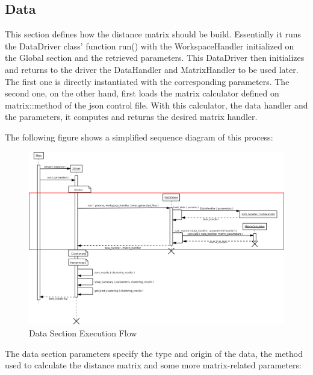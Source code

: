 \subsection{Data}

This section defines how the distance matrix should be build. Essentially it runs the DataDriver class' function run() with the WorkspaceHandler initialized on the Global section and the retrieved parameters. This DataDriver then initializes and returns to the driver the DataHandler and MatrixHandler to be used later. The first one is directly instantiated with the corresponding parameters. The second one, on the other hand, first loads the matrix calculator defined on matrix::method of the json control file. With this calculator, the data handler and the parameters, it computes and returns the desired matrix handler. 

The following figure shows a simplified sequence diagram of this process:

\begin{landscape}
\begin{figure}
\includegraphics[width=24cm]{img/data_sequence_driver.png}
\caption{Data Section Execution Flow}
\end{figure}
\end{landscape}



The data section parameters specify the type and origin of the data, the method used to calculate the distance matrix and some more matrix-related parameters:


